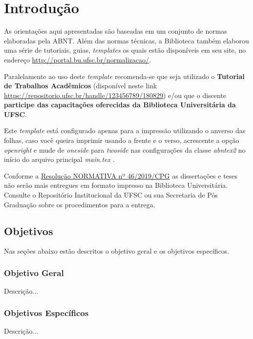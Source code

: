 \chapter{Introdução}

As orientações aqui apresentadas são baseadas em um conjunto de normas elaboradas pela \gls{ABNT}. Além das normas técnicas, a Biblioteca também elaborou uma série de tutoriais, guias, \textit{templates} os quais estão disponíveis em seu site, no endereço \url{http://portal.bu.ufsc.br/normalizacao/}.

Paralelamente ao uso deste \textit{template} recomenda-se que seja utilizado o \textbf{Tutorial de Trabalhos Acadêmicos} (disponível neste link \url{https://repositorio.ufsc.br/handle/123456789/180829}) e/ou que o discente \textbf{participe das capacitações oferecidas da Biblioteca Universitária da UFSC}.

Este \textit{template} está configurado apenas para a impressão utilizando o anverso das folhas, caso você queira imprimir usando a frente e o verso, acrescente a opção \textit{openright} e mude de \textit{oneside} para \textit{twoside} nas configurações da classe \textit{abntex2} no início do arquivo principal \textit{main.tex} \cite{abntex2classe}.

Conforme a \href{https://repositorio.ufsc.br/bitstream/handle/123456789/197121/RN46.2019.pdf?sequence=1&isAllowed=y}
{Resolução NORMATIVA nº 46/2019/CPG} as dissertações e teses não serão mais entregues 
em formato impresso na Biblioteca Universitária. Consulte o Repositório Institucional
 da UFSC ou sua Secretaria de Pós Graduação sobre os procedimentos para a entrega. \cite{KONO2018233}

\nocite{NBR6023:2002}
\nocite{NBR6027:2012}
\nocite{NBR6028:2003}
\nocite{NBR10520:2002}

\section{Objetivos}

Nas seções abaixo estão descritos o objetivo geral e os objetivos 
específicos.

\subsection{Objetivo Geral}

Descrição...

\subsection{Objetivos Específicos}

Descrição...